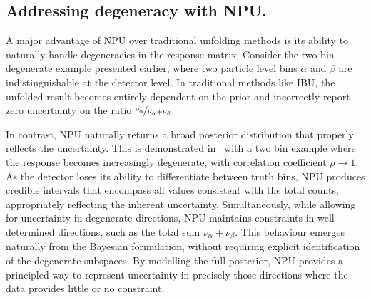 \subsection{Addressing degeneracy with NPU.}
    A major advantage of NPU over traditional unfolding methods is its ability to naturally handle degeneracies in the response matrix.
    Consider the two bin degenerate example presented earlier, where two particle level bins $\alpha$ and $\beta$ are indistinguishable at the detector level.
    In traditional methods like IBU, the unfolded result becomes entirely dependent on the prior and incorrectly report zero uncertainty on the ratio \(\nicefrac{\nu_\alpha}{\nu_\alpha+\nu_\beta}.\)

    In contrast, NPU naturally returns a broad posterior distribution that properly reflects the uncertainty.
    This is demonstrated in~\cite{acosta2024npu} with a two bin example where the response becomes increasingly degenerate, with correlation coefficient \(\rho\to 1\).
    As the detector loses its ability to differentiate between truth bins, NPU produces credible intervals that encompass all values consistent with the total counts, appropriately reflecting the inherent uncertainty.
    Simultaneously, while allowing for uncertainty in degenerate directions, NPU maintains constraints in well determined directions, such as the total sum $\nu_\alpha + \nu_\beta$.
    This behaviour emerges naturally from the Bayesian formulation, without requiring explicit identification of the degenerate subspaces.
    By modelling the full posterior, NPU provides a principled way to represent uncertainty in precisely those directions where the data provides little or no constraint.

